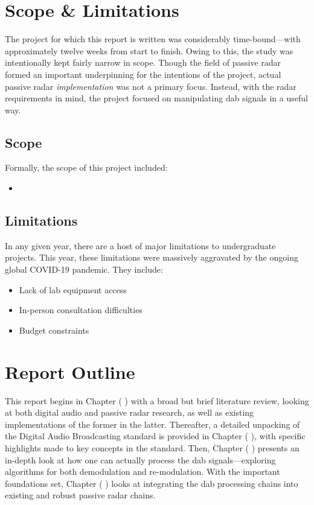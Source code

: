 \documentclass[class=report,11pt,crop=false]{standalone}
\begin{document}
\section{Scope \& Limitations}
The project for which this report is written was considerably time-bound---with approximately twelve weeks from start to finish. Owing to this, the study was intentionally kept fairly narrow in scope. Though the field of passive radar formed an important underpinning for the intentions of the project, actual passive radar \emph{implementation} was not a primary focus. Instead, with the radar requirements in mind, the project focused on manipulating \acrshort{dab} signals in a useful way.

\subsection{Scope}
Formally, the scope of this project included:
\begin{itemize}
    \item 
\end{itemize}

\subsection{Limitations}
In any given year, there are a host of major limitations to undergraduate projects. This year, these limitations were massively aggravated by the ongoing global COVID-19 pandemic. They include:
\begin{itemize}
    \item Lack of lab equipment access
    \item In-person consultation difficulties
    \item Budget constraints
\end{itemize}


\section{Report Outline}
This report begins in Chapter ( ) with a broad but brief literature review, looking at both digital audio and passive radar research, as well as existing implementations of the former in the latter. Thereafter, a detailed unpacking of the Digital Audio Broadcasting standard is provided in Chapter ( ), with specific highlights made to key concepts in the standard. Then, Chapter ( ) presents an in-depth look at how one can actually process the \acrshort{dab} signals---exploring algorithms for both demodulation and re-modulation. With the important foundations set, Chapter ( ) looks at integrating the \acrshort{dab} processing chains into existing and robust passive radar chains.




\ifstandalone

\printnoidxglossary[type=\acronymtype,nonumberlist]
\fi
\end{document}

